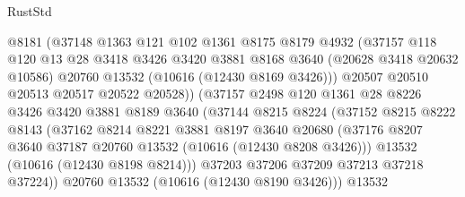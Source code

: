 \begin{lexlean}{RustStd}
\begin{coremodule}
                        @8181
                        (@37148
                          @1363
                          @121
                          @102
                          @1361
                          @8175
                          @8179
                          @4932
                          (@37157
                            @118
                            @120
                            @13
                            @28
                            @3418
                            @3426
                            @3420
                            @3881
                            @8168
                            @3640
                            (@20628 @3418 @20632 @10586)
                            @20760
                            @13532
                            (@10616 (@12430 @8169 @3426)))
                          @20507
                          @20510
                          @20513
                          @20517
                          @20522
                          @20528))
                      (@37157
                        @2498
                        @120
                        @1361
                        @28
                        @8226
                        @3426
                        @3420
                        @3881
                        @8189
                        @3640
                        (@37144
                          @8215
                          @8224
                          (@37152
                            @8215
                            @8222
                            @8143
                            (@37162
                              @8214
                              @8221
                              @3881
                              @8197
                              @3640
                              @20680
                              (@37176
                                @8207
                                @3640
                                @37187
                                @20760
                                @13532
                                (@10616 (@12430 @8208 @3426)))
                              @13532
                              (@10616 (@12430 @8198 @8214)))
                            @37203
                            @37206
                            @37209
                            @37213
                            @37218
                            @37224))
                        @20760
                        @13532
                        (@10616 (@12430 @8190 @3426)))
                      @13532

\end{coremodule}
\end{lexlean}
